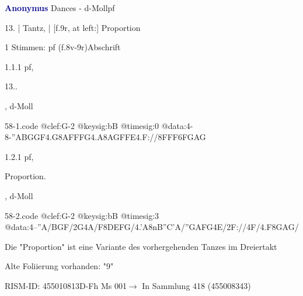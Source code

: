 \documentclass[twocolumn, 12pt]{book}
\begin{document}
\par \vspace{16pt} \textcolor{darkblue}{\textbf{Anonymus  }}\hfillplus{\textbf{[58]}}\newline Dances - d-Moll\newline pf
\par \begin{itshape}[f.8v, at left:] 13. | Tantz, | [f.9r, at left:] Proportion\end{itshape} 
\par \textcolor{darkblue}{}  1 Stimmen: pf  (f.8v-9r)\newline Abschrift
\par 1.1.1  pf, \begin{itshape}13..\end{itshape}, d-Moll  
\begin{filecontents*}{58-1.code}
@clef:G-2
@keysig:bB
@timesig:0
@data:4-8-''A{BGGF}4.G8A{FFFG}4.A8A{GFFE}4.F://8F{FF}{6FGAG}
\end{filecontents*}
\newline %
\par 1.2.1  pf, \begin{itshape}Proportion.\end{itshape}, d-Moll  
\begin{filecontents*}{58-2.code}
@clef:G-2
@keysig:bB
@timesig:3
@data:4--''A/BGF/2G4A/F{8DEFG}/4.'A{8nB''C'A}/{''GAFG}4E/2F://4F/4.F{8GAG}/
\end{filecontents*}
\newline %
\par Die "Proportion" ist eine Variante des vorhergehenden Tanzes im Dreiertakt
\par Alte Foliierung vorhanden: "9"
\par RISM-ID: 455010813\newline D-Fh  Ms 001\newline $\rightarrow$ In Sammlung 418 (455008343)
      
\end{document}
